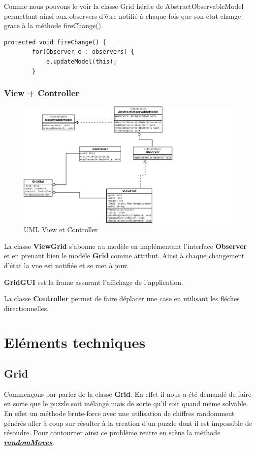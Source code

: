 \documentclass[12pt]{article}
\begin{document}
Comme nous pouvons le voir la classe Grid hérite de AbstractObservableModel permettant ainsi aux observers d'être notifié à chaque fois que son état change grace à la méthode fireChange().

\newpage
\begin{lstlisting}[tabsize=3,gobble=3]
	protected void fireChange() {
		for(Observer e : observers) {
			e.updateModel(this);
		}
\end{lstlisting}		
\subsubsection{View + Controller}
\begin{figure}[h!]
	\begin{center}
		\includegraphics[width=1.3\textwidth]{view.png}
	\end{center}
	\caption{UML View et Controller}
	\label{view}
\end{figure}
La classe \textbf{ViewGrid} s'abonne au modèle en implémentant l'interface \textbf{Observer}
et en prenant bien le modèle \textbf{Grid} comme attribut. Ainsi à chaque changement d'état 
la vue est notifiée et se met à jour.

\textbf{GridGUI} est la frame assurant l'affichage de l'application. 

La classe \textbf{Controller} permet de faire déplacer une case en utilisant les fléches directionnelles.

\section{Eléments techniques}
\subsection{Grid}
Commençons par parler de la classe \textbf{Grid}. En effet il nous a été demandé de faire en sorte que le puzzle soit mélangé mais de sorte qu'il soit quand même solvable.
En effet un méthode brute-force avec une utilisation de chiffres randomment générés aller à coup sur résulter à la creation d'un puzzle dont il est impossible de résoudre. Pour contourner ainsi ce problème rentre en scène la méthode \textbf{\textit{\underline{randomMoves}}}.
\end{document}
